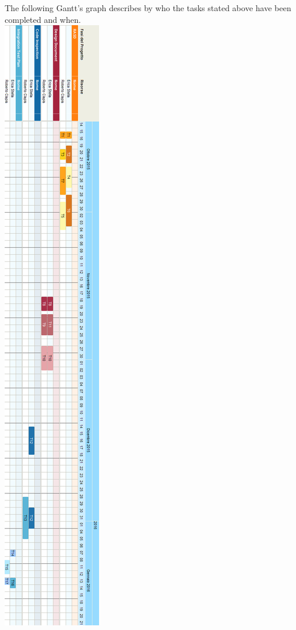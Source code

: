 \documentclass{article}
\begin{document}
The following Gantt's graph describes by who the tasks stated above have been completed and when.\\
\includegraphics[height = 1.0\textheight]{PROJECTPLAN}
\end{document}
